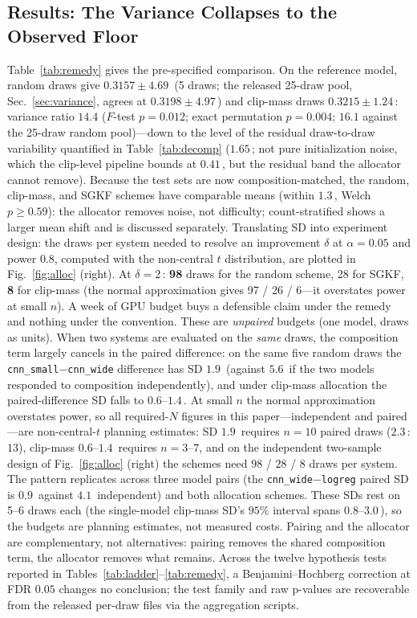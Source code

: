 ﻿\documentclass[journal]{IEEEtran}
\newcommand{\pp}{\,\text{pp}}
\begin{document}
\subsection{Results: The Variance Collapses to the Observed Floor}
Table~\ref{tab:remedy} gives the pre-specified comparison. On the reference model, random draws
give $0.3157 \pm 4.69$\pp{} (5 draws; the released 25-draw pool, Sec.~\ref{sec:variance}, agrees
at $0.3198 \pm 4.97$\pp) and clip-mass draws $0.3215 \pm 1.24$\pp: variance ratio $14.4$
($F$-test $p=0.012$; exact permutation $p=0.004$; $16.1$ against the 25-draw random pool)---down to the
level of the residual draw-to-draw variability quantified in Table~\ref{tab:decomp} ($1.65$\pp;
not pure initialization noise, which the clip-level pipeline bounds at $0.41$\pp, but the
residual band the allocator cannot remove). Because the test sets are now composition-matched, the
random, clip-mass, and SGKF schemes have comparable means (within $1.3$\pp, Welch $p\ge0.59$): the
allocator removes noise, not difficulty; count-stratified shows a larger mean shift and is
discussed separately. Translating SD into experiment design: the draws per system needed to
resolve an improvement $\delta$ at $\alpha=0.05$ and power $0.8$, computed with the non-central
$t$ distribution, are plotted in Fig.~\ref{fig:alloc} (right). At $\delta = 2$\pp: \textbf{98} draws for
the random scheme, 28 for SGKF, \textbf{8} for clip-mass (the normal approximation gives
97 / 26 / 6---it overstates power at small $n$). A week of GPU budget buys a defensible claim under the remedy and nothing under the
convention. These are \emph{unpaired} budgets (one model, draws as units). When two systems are
evaluated on the \emph{same} draws, the composition term largely cancels in the paired difference:
on the same five random draws the \texttt{cnn\_small}$-$\texttt{cnn\_wide} difference has SD
$1.9$\pp{} (against $5.6$\pp{} if the two models responded to composition independently), and
under clip-mass allocation the paired-difference SD falls to $0.6$--$1.4$\pp. At small $n$ the
normal approximation overstates power, so all required-$N$ figures in this paper---independent and
paired---are non-central-$t$ planning estimates: SD $1.9$\pp{} requires $n=10$ paired draws
($2.3$\pp: $13$), clip-mass $0.6$--$1.4$\pp{} requires $n=3$--$7$, and on the independent
two-sample design of Fig.~\ref{fig:alloc} (right) the schemes need $98$ / $28$ / $8$ draws per system.
The pattern replicates across three model pairs (the
\texttt{cnn\_wide}$-$\texttt{logreg} paired SD is $0.9$\pp{} against $4.1$\pp{} independent) and
both allocation schemes. These SDs rest on 5--6 draws each (the single-model
clip-mass SD's $95\%$ interval spans $0.8$--$3.0$\pp), so the budgets are planning estimates, not
measured costs. Pairing and the allocator are complementary, not
alternatives: pairing removes the shared composition term, the allocator removes what remains.
Across the twelve hypothesis tests reported in Tables~\ref{tab:ladder}--\ref{tab:remedy},
a Benjamini--Hochberg correction at FDR $0.05$ changes no conclusion; the test family and raw
p-values are recoverable from the released per-draw files via the aggregation scripts.
\end{document}
